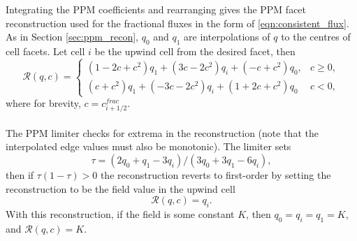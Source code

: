 \documentclass[11pt,a4paper]{article}
\begin{document}
Integrating the PPM coefficients and rearranging gives the PPM facet reconstruction used for the fractional fluxes in the form of \eqref{eqn:consistent_flux}.
As in Section \ref{sec:ppm_recon}, $q_0$ and $q_1$ are interpolations of $q$ to the centres of cell facets.
Let cell $i$ be the upwind cell from the desired facet, then
\begin{equation}
\mathcal{R}(q,c) =
\begin{cases}
(1-2c+c^2)q_1 + (3c-2c^2)q_{i} + (-c+c^2)q_0, & c \geq 0, \\
(c+c^2)q_1 + (-3c-2c^2)q_{i} + (1+2c+c^2)q_0 & c < 0,
\end{cases}
\end{equation}
where for brevity, $c=c^{frac}_{i+1/2}$. \\
\\
The PPM limiter checks for extrema in the reconstruction (note that the interpolated edge values must also be monotonic). The limiter sets
\begin{equation}
\tau = (2q_0+q_1-3q_{i})/(3q_0+3q_1-6q_{i}),
\end{equation}
then if $\tau (1-\tau) > 0$ the reconstruction reverts to first-order by setting the reconstruction to be the field value in the upwind cell
\begin{equation}
\mathcal{R}(q,c) = q_i.
\end{equation}
With this reconstruction, if the field is some constant $K$, then $q_0=q_i=q_1=K$, and $\mathcal{R}(q,c)=K$.

\end{document}
